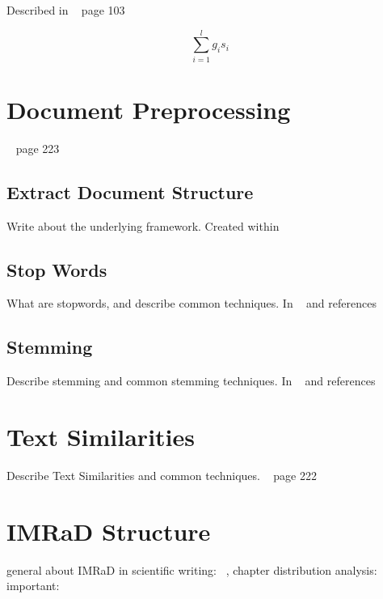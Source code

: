 Described in ~\cite{manning2008} page 103

\begin{equation}
  \sum_{i = 1}^{l}g_i s_i
\end{equation}

\section{Document Preprocessing}
\label{sec:document_preprocessing}

~\cite{ModernInvormationRetrieval1999} page 223

\subsection{Extract Document Structure}
\label{subsec:extract_document_structure}

Write about the underlying framework. Created within ~\cite{KlampflGJK14}

\subsection{Stop Words}
\label{subsec:stop_words}

What are stopwords, and describe common techniques. In ~\cite{Vijayarani2015} and references

\subsection{Stemming}
\label{subsec:stemming}

Describe stemming and common stemming techniques. In ~\cite{Vijayarani2015} and references

\section{Text Similarities}
\label{sec:text_similarities}

Describe Text Similarities and common techniques. ~\cite{ModernInvormationRetrieval1999} page 222

\section{IMRaD Structure}
\label{sec:imrad_structure}

general about IMRaD in scientific writing: ~\cite{robert1989}, chapter distribution analysis: ~\cite{bertin2013} important: ~\cite{Sollaci-The-2004}

